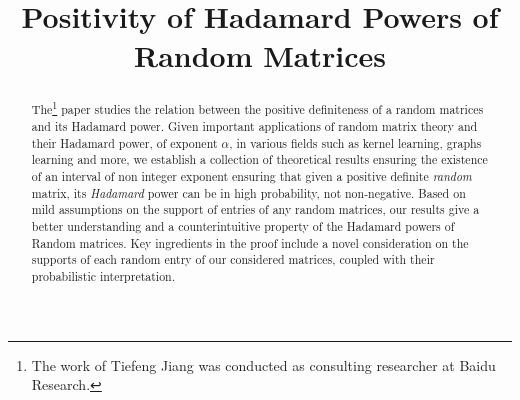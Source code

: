 \documentclass[conference,letterpaper]{IEEEtran}
\numberwithin{equation}{section}
\begin{document}
\title{Positivity of Hadamard Powers of Random Matrices}


\author{%
  \and
}



\maketitle


\begin{abstract}
\noindent The\footnote{The work of Tiefeng Jiang was conducted as consulting researcher at Baidu Research.} paper studies the relation between the positive definiteness of a random matrices and its Hadamard power.
Given important applications of random matrix theory and their Hadamard power, of exponent $\alpha$, in various fields such as kernel learning, graphs learning and more, we establish a collection of theoretical results ensuring the existence of an interval of non integer exponent ensuring that given a positive definite \emph{random} matrix, its \emph{Hadamard} power can be in high probability, not non-negative.
Based on mild assumptions on the support of entries of any random matrices, our results give a better understanding and a counterintuitive property of the Hadamard powers of Random matrices.
Key ingredients in the proof include a novel consideration on the supports of each random entry of our considered matrices, coupled with their probabilistic interpretation.\\
\end{abstract}
\end{document}
